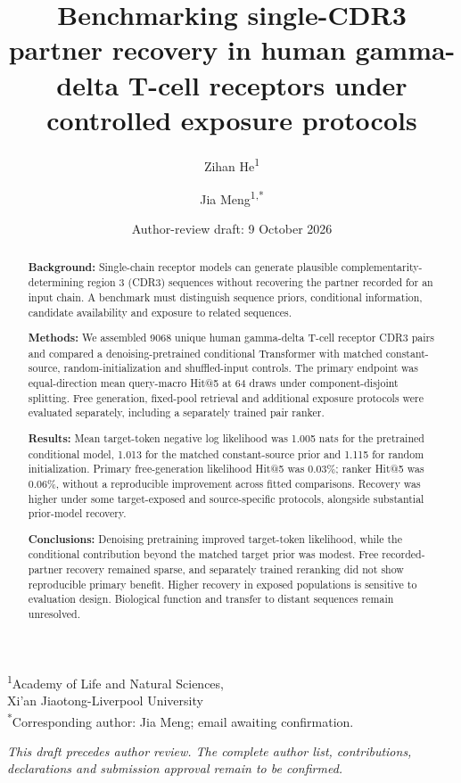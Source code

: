 \documentclass[12pt]{article}
\title{Benchmarking single-CDR3 partner recovery in human gamma-delta T-cell receptors under controlled exposure protocols}
\author{Zihan He\textsuperscript{1} \and Jia Meng\textsuperscript{1,*}}
\date{Author-review draft: 9 October 2026}
\begin{document}
\linenumbers
\maketitle
\begin{center}
\textsuperscript{1}Academy of Life and Natural Sciences,\\
Xi'an Jiaotong-Liverpool University\\
\textsuperscript{*}Corresponding author: Jia Meng; email awaiting confirmation.
\end{center}
\noindent\textit{This draft precedes author review. The complete author list,
contributions, declarations and submission approval remain to be confirmed.}

\begin{abstract}
\textbf{Background:} Single-chain receptor models can generate plausible
complementarity-determining region 3 (CDR3)
sequences without recovering the partner recorded for an input chain. A
benchmark must distinguish sequence priors, conditional information, candidate
availability and exposure to related sequences.

\textbf{Methods:} We assembled 9068 unique human gamma-delta T-cell receptor
CDR3 pairs and compared a denoising-pretrained conditional Transformer with
matched constant-source, random-initialization and shuffled-input controls.
The primary endpoint was equal-direction mean query-macro Hit@5 at 64 draws
under component-disjoint splitting. Free generation, fixed-pool retrieval and
additional exposure protocols were evaluated separately, including a separately
trained pair ranker.

\textbf{Results:} Mean target-token negative log likelihood was 1.005 nats for
the pretrained conditional model, 1.013 for the matched constant-source prior
and 1.115 for random initialization. Primary free-generation likelihood Hit@5
was 0.03\%; ranker Hit@5 was 0.06\%, without a reproducible improvement across
fitted comparisons. Recovery was higher under some target-exposed and
source-specific protocols, alongside substantial prior-model recovery.

\textbf{Conclusions:} Denoising pretraining improved target-token likelihood,
while the conditional contribution beyond the matched target prior was modest.
Free recorded-partner recovery remained sparse, and separately trained
reranking did not show reproducible primary benefit. Higher recovery in exposed
populations is sensitive to evaluation design. Biological function and
transfer to distant sequences remain unresolved.
\end{abstract}
\end{document}
